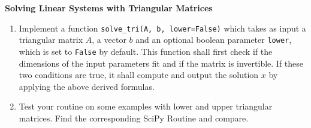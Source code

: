\textbf{Solving Linear Systems with Triangular Matrices}

\begin{enumerate}
	\item Implement a function \verb|solve_tri(A, b, lower=False)| which takes as input a triangular matrix $A$, a vector $b$ and an optional boolean parameter \verb|lower|, which is set to \verb|False| by default. This function shall first check if the dimensions of the input parameters fit and if the matrix is invertible. If these two conditions are true, it shall compute and output the solution $x$ by applying the above derived formulas.%
	\item Test your routine on some examples with lower and upper triangular matrices. Find the corresponding SciPy Routine and compare.
\end{enumerate}


